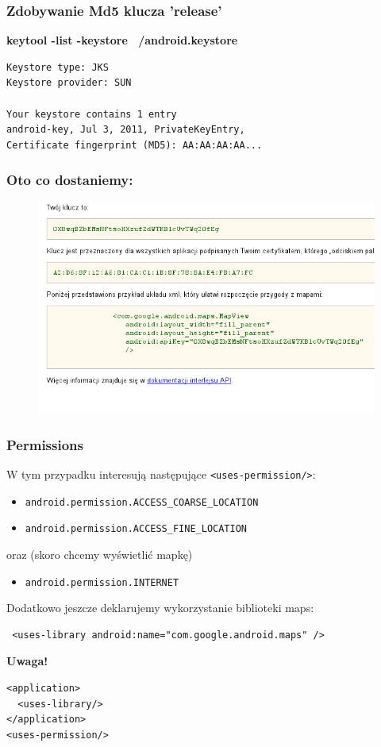 \begin{frame}[fragile]\frametitle{Zdobywanie Md5 klucza 'release'}

\textbf{keytool -list -keystore ~/android.keystore }

\begin{lstlisting}
Keystore type: JKS
Keystore provider: SUN

Your keystore contains 1 entry
android-key, Jul 3, 2011, PrivateKeyEntry, 
Certificate fingerprint (MD5): AA:AA:AA:AA...
\end{lstlisting}

\end{frame}


\begin{frame}\frametitle{Oto co dostaniemy:}
\begin{figure}
 \centering
 \includegraphics[width=\textwidth,keepaspectratio=true]{images/maps_get_key}
\end{figure} 
\end{frame}


\begin{frame}[fragile]\frametitle{Permissions}

W tym przypadku interesują następujące \verb|<uses-permission/>|:

\begin{itemize}
 \item \verb|android.permission.ACCESS_COARSE_LOCATION|
 \item \verb|android.permission.ACCESS_FINE_LOCATION|
\end{itemize}

oraz (skoro chcemy wyświetlić mapkę)
\begin{itemize}
 \item \verb|android.permission.INTERNET|
\end{itemize}

\pause
Dodatkowo jeszcze deklarujemy wykorzystanie biblioteki maps:
\begin{verbatim}
 <uses-library android:name="com.google.android.maps" />
\end{verbatim}

\textbf{Uwaga!}
\begin{lstlisting}
<application>
  <uses-library/> 
</application>
<uses-permission/>
\end{lstlisting}
\end{frame}

